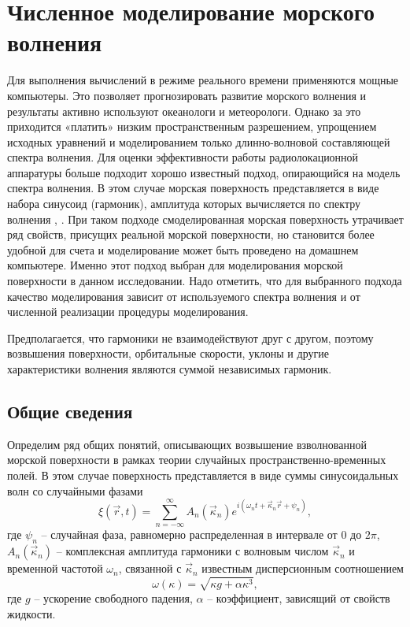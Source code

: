\newcommand{\tK}{\widetilde K}
\section{Численное моделирование морского волнения}

Для выполнения вычислений в режиме реального времени применяются
мощные компьютеры. Это позволяет прогнозировать развитие морского волнения и
результаты активно используют океанологи и метеорологи. Однако за это
приходится «платить» низким пространственным разрешением, упрощением исходных
уравнений и моделированием только длинно-волновой составляющей спектра
волнения.  Для оценки эффективности работы радиолокационной аппаратуры больше
подходит хорошо известный подход, опирающийся на модель спектра волнения. В
этом случае морская поверхность представляется в виде набора синусоид
(гармоник), амплитуда которых вычисляется по спектру
волнения \cite{longe-higgins}, \cite{karaev}. При
таком подходе смоделированная морская поверхность утрачивает ряд свойств,
присущих реальной морской поверхности, но становится более удобной для счета и
моделирование может быть проведено на домашнем компьютере. Именно
этот подход выбран для моделирования морской поверхности в данном исследовании.
Надо отметить, что для выбранного подхода качество моделирования зависит от
используемого спектра волнения и от численной реализации процедуры
моделирования.

Предполагается, что гармоники не взаимодействуют друг с другом, поэтому возвышения поверхности, орбитальные
скорости, уклоны и другие характеристики волнения являются суммой
независимых гармоник.

\subsection{Общие сведения}%
\label{sec:obshchie_poniatiia}
Определим ряд общих понятий, описывающих возвышение взволнованной морской поверхности в рамках теории случайных пространственно-временных полей. В этом случае поверхность представляется в виде суммы синусоидальных волн со случайными фазами 
\begin{equation}
    \label{eq:surface}
    \xi(\vec r,t) = \sum\limits_{n=-\infty}^{\infty} 
        A_n(\vec \kappa_n) e^{i(\omega_n t + \vec \kappa_n \vec r + \psi_n)},
\end{equation}
где $\psi_n$ -- случайная фаза,
равномерно распределенная в интервале от $0$ до  $2 \pi$, 
$A_n (\vec \kappa_n)$ -- комплексная амплитуда гармоники с волновым числом
$\vec \kappa_n$ и временной частотой  $\omega_n$, связанной с  $\vec \kappa_n$ известным
дисперсионным соотношением
\begin{equation}
    \omega(\kappa) = \sqrt{\kappa g + \alpha \kappa^3},
\end{equation}
где $g$ -- ускорение свободного падения,  $\alpha$ -- коэффициент, 
зависящий от свойств жидкости.


